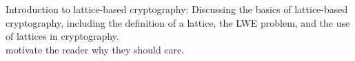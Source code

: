 Introduction to lattice-based cryptography: Discussing the basics of lattice-based cryptography, including the definition of a lattice, the LWE problem, and the use of lattices in cryptography.\\

motivate the reader why they should care.